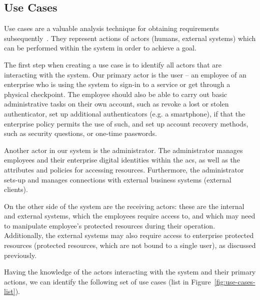 \subsection{Use Cases} \label{sec:analysis-usecases}
Use cases are a valuable analysis technique for obtaining requirements subsequently~\cite{Cockburn2000WritingCases}. They represent actions of actors (humans, external systems) which can be performed within the system in order to achieve a goal. 

The first step when creating a use case is to identify all actors that are interacting with the system. Our primary actor is the user -- an employee of an enterprise who is using the system to sign-in to a service or get through a physical checkpoint. The employee should also be able to carry out basic administrative tasks on their own account, such as revoke a lost or stolen authenticator, set up additional authenticators (e.g. a smartphone), if that the enterprise policy permits the use of such, and set up account recovery methods, such as security questions, or one-time passwords.

Another actor in our system is the administrator. The administrator manages employees and their enterprise digital identities within the \acrshort{acs}, as well as the attributes and policies for accessing resources. Furthermore, the administrator sets-up and manages connections with external business systems (external clients). 

On the other side of the system are the receiving actors: these are the internal and external systems, which the employees require access to, and which may need to manipulate employee's protected resources during their operation. Additionally, the external systems may also require access to enterprise protected resources (protected resources, which are not bound to a single user), as discussed previously\footnotemark.
% 

Having the knowledge of the actors interacting with the system and their primary actions, we can identify the following set of use cases (list in Figure~\ref{fig:use-cases-list}). 

